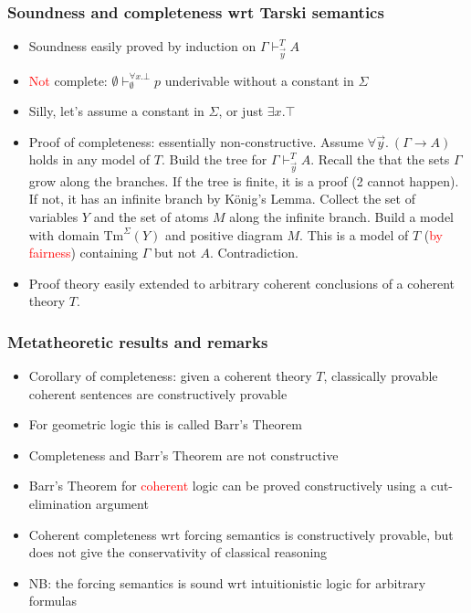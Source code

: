 \documentclass[handout,11pt]{beamer}
\newcommand{\red}[1]{\textcolor{red}{#1}}
\begin{document}
\begin{frame}
\frametitle{Soundness and completeness wrt Tarski semantics}
 \begin{itemize}[<+->]   %
    \item Soundness easily proved by induction on $\Gamma\vdash_{\vec{y}}^T A$
    \item \red{Not} complete: $\emptyset\vdash_{\emptyset}^{\forall x.\bot} p$
    underivable without a constant in $\Sigma$
    \item Silly, let's assume a constant in $\Sigma$, or just $\exists x.\top$
    \item Proof of completeness: essentially non-constructive.
    Assume $\forall\vec{y}.~(\Gamma \to A)$ holds in any model of $T$.
    Build the tree for $\Gamma\vdash_{\vec{y}}^T A$. Recall the that 
    the sets $\Gamma$ grow along the branches. If the tree is finite, 
    it is a proof (2 cannot happen). If not, it has an infinite branch
    by K\"onig's Lemma. Collect the set of variables $Y$ and the set
    of atoms $M$ along the infinite branch. Build a model with domain
    $\mathrm{Tm}^\Sigma(Y)$ and positive diagram $M$. This is a model of
    $T$ (\red{by fairness}) containing $\Gamma$ but not $A$. Contradiction.
 
    \item Proof theory easily extended to arbitrary coherent 
    conclusions of a coherent theory $T$.
 \end{itemize}
\end{frame}

\begin{frame}
\frametitle{Metatheoretic results and remarks}
 \begin{itemize}[<+->]   %
    \item Corollary of completeness: given a coherent theory $T$,
    classically provable coherent sentences are constructively provable
    \item For \alert{geometric} logic this is called Barr's Theorem
    \item Completeness and Barr's Theorem are \alert{not} constructive
    \item Barr's Theorem for \red{coherent} logic can be proved 
    constructively using a cut-elimination argument %
    \item Coherent completeness wrt forcing semantics is constructively
    provable, but does not give the conservativity of classical reasoning
    \item NB: the forcing semantics is sound wrt intuitionistic logic 
    for arbitrary formulas
 \end{itemize}
\end{frame}
\end{document}
